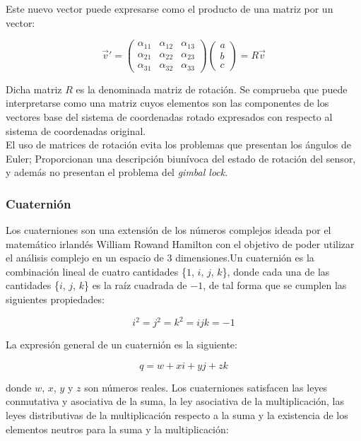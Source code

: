 \documentclass[10pt, a4paper]{report}
\begin{document}
Este nuevo vector puede expresarse como el producto de una matriz por un vector:

$$ \vec{v}' = \left( \begin{smallmatrix}  \alpha_{11} & \alpha_{12} & \alpha_{13} \\ \alpha_{21} & \alpha_{22} & \alpha_{23}\\ \alpha_{31} & \alpha_{32} & \alpha_{33} \end{smallmatrix} \right) \left( \begin{smallmatrix} a \\ b \\ c \end{smallmatrix} \right) = R \vec{v}$$

Dicha matriz $R$ es la denominada matriz de rotación. Se comprueba que puede interpretarse como una matriz cuyos elementos son las componentes de los vectores base del sistema de coordenadas rotado expresados con respecto al sistema de coordenadas original.\\

El uso de matrices de rotación evita los problemas que presentan los ángulos de Euler; Proporcionan una descripción biunívoca del estado de rotación del sensor, y además no presentan el problema del \textit{gimbal lock}. 

\subsubsection{Cuaternión}

Los cuaterniones son una extensión de los números complejos ideada por el matemático irlandés William Rowand Hamilton con el objetivo de poder utilizar el análisis complejo en un espacio de 3 dimensiones.Un cuaternión es la combinación lineal de cuatro cantidades \{$1$, $i$, $j$, $k$\}, donde cada una de las cantidades \{$i$, $j$, $k$\} es la raíz cuadrada de $-1$, de tal forma que se cumplen las siguientes propiedades:

$$ i^2 = j^2 = k^2 = ijk = -1 $$

La expresión general de un cuaternión es la siguiente:

$$ q = w + xi + yj + zk $$

donde $w$, $x$, $y$ y $z$ son números reales. Los cuaterniones satisfacen las leyes conmutativa y asociativa de la suma, la ley asociativa de la multiplicación, las leyes distributivas de la multiplicación respecto a la suma y la existencia de los elementos neutros para la suma y la multiplicación:
\end{document}
